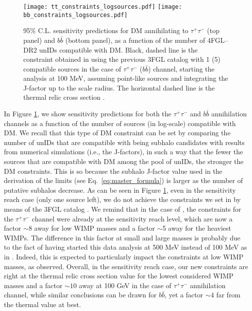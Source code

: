 \documentclass[%
 reprint,
nofootinbib,
 amsmath,amssymb,
 aps,
]{revtex4-2}
\begin{document}
\begin{figure}[!ht]
\centering
\texttt{[image: tt\_constraints\_logsources.pdf]}
\texttt{[image: bb\_constraints\_logsources.pdf]}
\caption{95\% C.L. sensitivity predictions for DM annihilating to $\tau^+\tau^-$ (top panel) and $b\bar{b}$ (bottom panel), as a function of the number of 4FGL--DR2 unIDs compatible with DM. Black, dashed line is the constraint obtained in  using the previous 3FGL catalog \cite{Acero2015} with 1 (5) compatible sources in the case of $\tau^+\tau^-$ ($b\bar{b}$) channel, starting the analysis at 100 MeV, assuming point-like sources and integrating the J-factor up to the scale radius. The horizontal dashed line is the thermal relic cross section \cite{Bringmann2020}.}
\label{fig:constraints_contour}
\end{figure}

In Figure \ref{fig:constraints_contour}, we show {sensitivity predictions} for both the $\tau^+\tau^-$ and $b\bar{b}$ annihilation channels as a function of the number of sources (in log-scale) compatible with DM. {  We recall that this type of DM constraint can be set by comparing the number of unIDs that are compatible with being subhalo candidates with results from numerical simulations (i.e., the J-factors), in such a way that the fewer the sources that are compatible with DM among the pool of unIDs, the stronger the DM constraints. This is so because the subhalo J-factor value used in the derivation of the limits (see Eq.~\ref{eq:master_formula}) is larger as the number of putative subhalos decrease.} As can be seen in Figure \ref{fig:constraints_contour}, even in the sensitivity reach case (only one source left), we do not achieve the constraints we set in  by means of the 3FGL catalog \cite{Acero2015}. We remind that in the case of , the constraints for the $\tau^+\tau^-$ channel were already at the sensitivity reach level, which are now a factor $\sim$8 away for low WIMP masses and a factor $\sim$5 away for the heaviest WIMPs. The difference in this factor at small and large masses is probably due to the fact of having started this data analysis at 500 MeV instead of 100 MeV as in . Indeed, this is expected to particularly impact the constraints at low WIMP masses, as observed. Overall, in the sensitivity reach case, our new constraints are right at the thermal relic cross section value for the lowest considered WIMP masses and a factor $\sim10$ away at 100 GeV in the case of $\tau^+\tau^-$ annihilation channel, while similar conclusions can be drawn for $b\bar{b}$, yet a factor $\sim4$ far from the thermal value at best.
\end{document}
